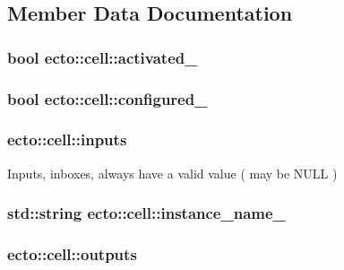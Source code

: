\subsection{\-Member \-Data \-Documentation}
\hypertarget{structecto_1_1cell_ad270620c006f30471b2371feb38b6a03}{
\subsubsection[{activated\-\_\-}]{\setlength{\rightskip}{0pt plus 5cm}bool {\bf ecto\-::cell\-::activated\-\_\-}}}\label{structecto_1_1cell_ad270620c006f30471b2371feb38b6a03}
\hypertarget{structecto_1_1cell_a187d36610ae8035e9f589de06ecc0d0a}{
\subsubsection[{configured\-\_\-}]{\setlength{\rightskip}{0pt plus 5cm}bool {\bf ecto\-::cell\-::configured\-\_\-}}}\label{structecto_1_1cell_a187d36610ae8035e9f589de06ecc0d0a}
\hypertarget{structecto_1_1cell_a65099b0458a7761b8bfa7a1ddc17e92f}{
\subsubsection[{inputs}]{ {\bf ecto\-::cell\-::inputs}}}\label{structecto_1_1cell_a65099b0458a7761b8bfa7a1ddc17e92f}


\-Inputs, inboxes, always have a valid value ( may be \-N\-U\-L\-L ) 

\hypertarget{structecto_1_1cell_a2bf4e65c7a699624c61d3b55cfac45ed}{
\subsubsection[{instance\-\_\-name\-\_\-}]{\setlength{\rightskip}{0pt plus 5cm}std\-::string {\bf ecto\-::cell\-::instance\-\_\-name\-\_\-}}}\label{structecto_1_1cell_a2bf4e65c7a699624c61d3b55cfac45ed}
\hypertarget{structecto_1_1cell_a93951743b603faba35312ebdb07ceb22}{
\subsubsection[{outputs}]{ {\bf ecto\-::cell\-::outputs}}}\label{structecto_1_1cell_a93951743b603faba35312ebdb07ceb22}


